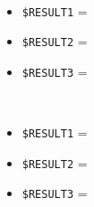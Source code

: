 \documentclass[../../SperimentazioniPratiche.tex]{subfiles}
\begin{document}
\begin{tcolorbox}[fonttitle=\bfseries, 
								adjusted title={\Large Prova 4A.1}, 
								breakable, 
								sharp corners=south,
								colback=white, 
								colframe=white!60!black]
\begin{description}[leftmargin=0.7cm,labelwidth=!]
\begin{description}
        					\item[\dispositivoA] \ \par
        					\begin{itemize}
        						\item \verb|$RESULT1| = \ok
        						\item \verb|$RESULT2| = \ok
        						\item \verb|$RESULT3| = \ok
        					\end{itemize}      					
        					
        					\item[\dispositivoB] \ \par
        					\begin{itemize}
        						\item \verb|$RESULT1| = \ok
        						\item \verb|$RESULT2| = \ok
        						\item \verb|$RESULT3| = \ok
        					\end{itemize}
        					
        				\end{description}
        				
        				
				\end{description}  
				
			\end{tcolorbox}



	
	\newpage	
\end{document}
